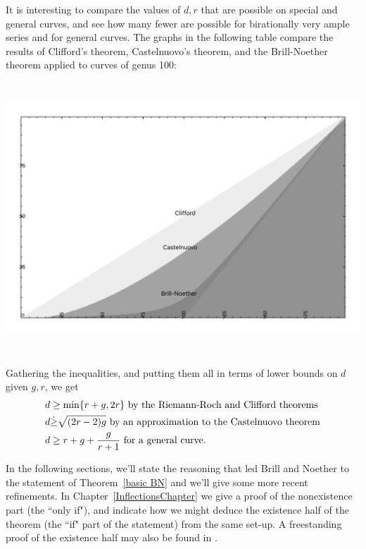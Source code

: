 
It is interesting to compare the values of $d,r$ that are possible on special and general curves, and see how many fewer are possible for birationally very ample series and for general curves. The graphs in the following table compare the results of 
Clifford's theorem, Castelnuovo's theorem, and the Brill-Noether theorem applied to curves
of genus 100:

\centerline{ \includegraphics[height=4in]{"Clifford-Castelnuovo-Brill-Noether"}}

Gathering the inequalities, and putting them all in terms of lower bounds on $d$ given $g, r$,
we get \goodbreak
\begin{align*}
 d &\geq \min\{r+g, 2r\} \hbox{ by the Riemann-Roch and Clifford theorems}\\
 d &\dot\geq \sqrt{(2r-2)g} \hbox{ by an approximation to the Castelnuovo theorem}\\
 d &\geq r+g+\frac{g}{r+1} \hbox{ for a general curve.}
\end{align*}

In the following sections, we'll state the reasoning that led Brill and Noether to the statement of Theorem~\ref{basic BN} and we'll give some more recent refinements.   In Chapter~\ref{InflectionsChapter} we give a proof of the nonexistence part (the ``only if"), and indicate how we might deduce  the existence half of the theorem (the ``if" part of the statement) from the same set-up. A freestanding proof of the existence half may also be found in \cite[Theorem ****]{3264}.

